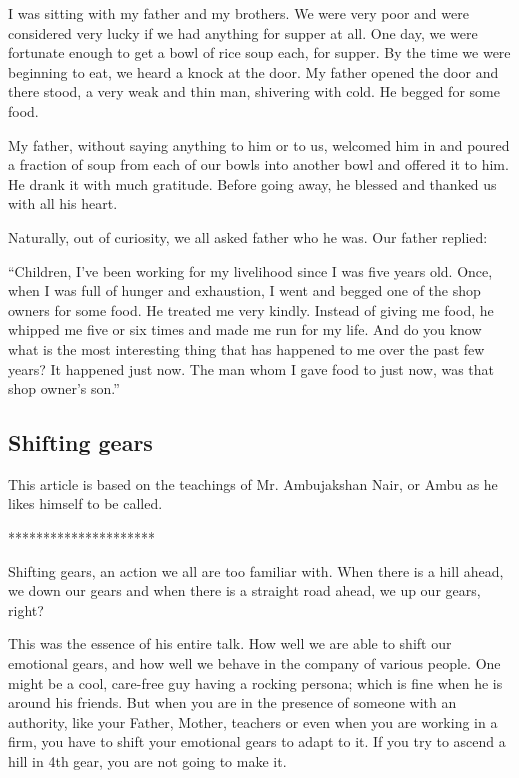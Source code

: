 \documentclass[twoside,11pt]{article}
\begin{document}
I was sitting with my father and my brothers. We were very poor and were considered very lucky if we had anything for supper at all. One day, we were fortunate enough to get a bowl of rice soup each, for supper. By the time we were beginning to eat, we heard a knock at the door. My father opened the door and there stood, a very weak and thin man, shivering with cold. He begged for some food.

My father, without saying anything to him or to us, welcomed him in and poured a fraction of soup from each of our bowls into another bowl and offered it to him. He drank it with much gratitude. Before going away, he blessed and thanked us with all his heart.

Naturally, out of curiosity, we all asked father who he was. Our father replied:

``Children, I've been working for my livelihood since I was five years old. Once, when I was full of hunger and exhaustion, I went and begged one of the shop owners for some food. He treated me very kindly. Instead of giving me food, he whipped me five or six times and made me run for my life. And do you know what is the most interesting thing that has happened to me over the past few years? It happened just now. The man whom I gave food to just now, was that shop owner's son.''

\newpage
\begin{center}
  \section{Shifting gears}
\end{center}
\bigskip
\bigskip
\bigskip

This article is based on the teachings of Mr. Ambujakshan Nair, or Ambu as he likes himself to be called.

\bigskip
\begin{center}
*********************
\end{center}

Shifting gears, an action we all are too familiar with. When there is a hill ahead, we down our gears and when there is a straight road ahead, we up our gears, right?

This was the essence of his entire talk. How well we are able to shift our emotional gears, and how well we behave in the company of various people. One might be a cool, care-free guy having a rocking persona; which is fine when he is around his friends. But when you are in the presence of someone with an authority, like your Father, Mother, teachers or even when you are working in a firm, you have to shift your emotional gears to adapt to it. If you try to ascend a hill in 4th gear, you are not going to make it.
\end{document}
